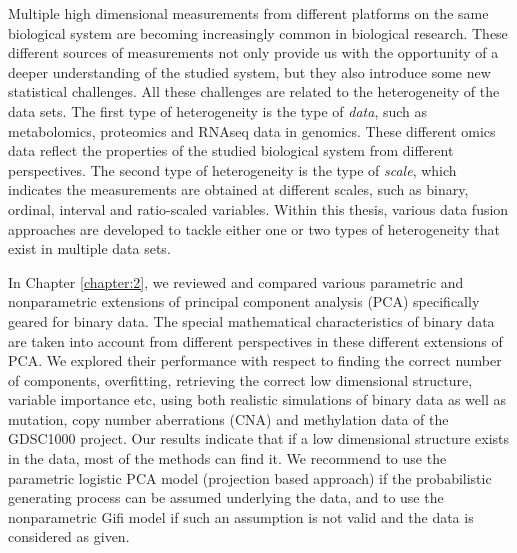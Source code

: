 \summary
Multiple high dimensional measurements from different platforms on the same biological system are becoming increasingly common in biological research. These different sources of measurements not only provide us with the opportunity of a deeper understanding of the studied system, but they also introduce some new statistical challenges. All these challenges are related to the heterogeneity of the data sets. The first type of heterogeneity is the type of \emph{data}, such as metabolomics, proteomics and RNAseq data in genomics. These different omics data reflect the properties of the studied biological system from different perspectives. The second type of heterogeneity is the type of \emph{scale}, which indicates the measurements are obtained at different scales, such as binary, ordinal, interval and ratio-scaled variables. Within this thesis, various data fusion approaches are developed to tackle either one or two types of heterogeneity that exist in multiple data sets.

In Chapter \ref{chapter:2}, we reviewed and compared various parametric and nonparametric extensions of principal component analysis (PCA) specifically geared for binary data. The special mathematical characteristics of binary data are taken into account from different perspectives in these different extensions of PCA. We explored their performance with respect to finding the correct number of components, overfitting, retrieving the correct low dimensional structure, variable importance etc, using both realistic simulations of binary data as well as mutation, copy number aberrations (CNA) and methylation data of the GDSC1000 project. Our results indicate that if a low dimensional structure exists in the data, most of the methods can find it. We recommend to use the parametric logistic PCA model (projection based approach) if the probabilistic generating process can be assumed underlying the data, and to use the nonparametric Gifi model if such an assumption is not valid and the data is considered as given.

